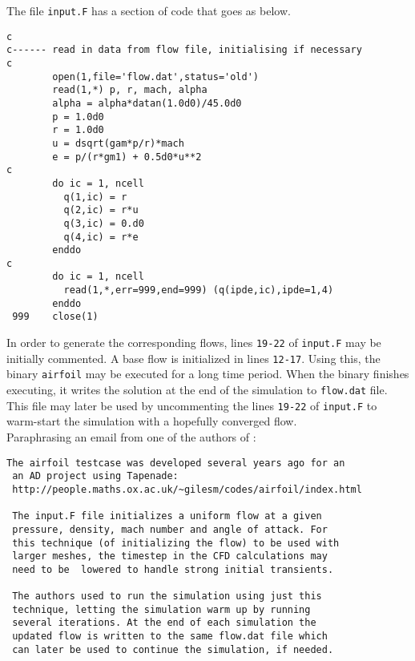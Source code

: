 \noindent The file \texttt{input.F} has a section of code that goes as below.\\

\begin{lstlisting}[language=myfortran]
c
c------ read in data from flow file, initialising if necessary
c
        open(1,file='flow.dat',status='old')
        read(1,*) p, r, mach, alpha
        alpha = alpha*datan(1.0d0)/45.0d0
        p = 1.0d0
        r = 1.0d0
        u = dsqrt(gam*p/r)*mach
        e = p/(r*gm1) + 0.5d0*u**2
c
        do ic = 1, ncell
          q(1,ic) = r
          q(2,ic) = r*u
          q(3,ic) = 0.d0
          q(4,ic) = r*e
        enddo
c
        do ic = 1, ncell
          read(1,*,err=999,end=999) (q(ipde,ic),ipde=1,4)
        enddo
 999    close(1)
\end{lstlisting}
\hfill \break
In order to generate the corresponding flows, lines \texttt{19-22} of \texttt{input.F} may be initially commented. A base flow is initialized in lines \texttt{12-17}. Using this, the binary \texttt{airfoil} may be executed for a long time period. When the binary finishes executing, it writes the solution at the end of the simulation to \texttt{flow.dat} file. This file may later be used by uncommenting the lines \texttt{19-22} of \texttt{input.F} to warm-start the simulation with a hopefully converged flow.\\

\noindent Paraphrasing an email from one of the authors of \cite{Giles_2005}:

\begin{Verbatim}[xleftmargin=2em]
 The airfoil testcase was developed several years ago for an
 an AD project using Tapenade:
 http://people.maths.ox.ac.uk/~gilesm/codes/airfoil/index.html

 The input.F file initializes a uniform flow at a given 
 pressure, density, mach number and angle of attack. For 
 this technique (of initializing the flow) to be used with
 larger meshes, the timestep in the CFD calculations may
 need to be  lowered to handle strong initial transients.

 The authors used to run the simulation using just this
 technique, letting the simulation warm up by running 
 several iterations. At the end of each simulation the
 updated flow is written to the same flow.dat file which
 can later be used to continue the simulation, if needed.
\end{Verbatim}
